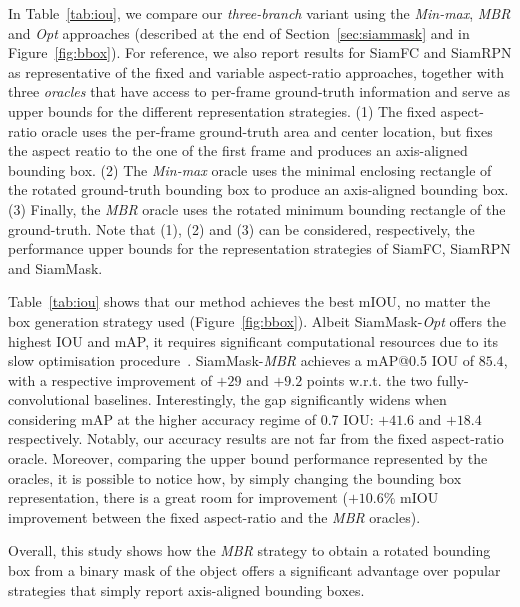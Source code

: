 In Table~\ref{tab:iou}, we compare our \emph{three-branch} variant using the \emph{Min-max}, \emph{MBR} and \emph{Opt} approaches (described at the end of Section~\ref{sec:siammask} and in Figure~\ref{fig:bbox}).
For reference, we also report results for SiamFC and SiamRPN as representative of the fixed and variable aspect-ratio approaches, together with three \emph{oracles} that have access to per-frame ground-truth information and serve as upper bounds for the different representation strategies.
(1) The fixed aspect-ratio oracle uses the per-frame ground-truth area and center location, but fixes the aspect reatio to the one of the first frame and produces an axis-aligned bounding box.
(2) The \emph{Min-max} oracle uses the minimal enclosing rectangle of the rotated ground-truth bounding box to produce an axis-aligned bounding box.
(3) Finally, the \textit{MBR} oracle uses the rotated minimum bounding rectangle of the ground-truth.
Note that (1), (2) and (3) can be considered, respectively, the performance upper bounds for the representation strategies of SiamFC, SiamRPN and SiamMask.

Table~\ref{tab:iou} shows that our method achieves the best mIOU, no matter the box generation strategy used (Figure~\ref{fig:bbox}).
Albeit SiamMask-\textit{Opt} offers the highest IOU and mAP, it requires significant computational resources due to its slow optimisation procedure~\cite{vojir2017pixel}. 
SiamMask-\textit{MBR} achieves a mAP@0.5 IOU  of $85.4$, with a respective improvement of $+29$ and $+9.2$ points w.r.t. the two fully-convolutional baselines.
Interestingly, the gap significantly widens when considering mAP at the higher accuracy regime of 0.7 IOU: $+41.6$ and $+18.4$ respectively.
Notably, our accuracy results are not far from the fixed aspect-ratio oracle.
Moreover, comparing the upper bound performance represented by the oracles, it is possible to notice how, by simply changing the bounding box representation, there is a great room for improvement (\eg $+10.6\%$ mIOU improvement between the fixed aspect-ratio and the \textit{MBR} oracles).

Overall, this study shows how the \textit{MBR} strategy to obtain a rotated bounding box from a binary mask of the object offers a significant advantage over popular strategies that simply report axis-aligned bounding boxes.

